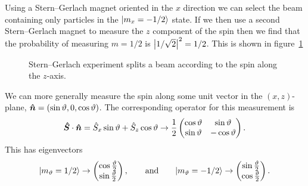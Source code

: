     Using a Stern--Gerlach magnet oriented in the \(x\) direction we can select the beam containing only particles in the \(\vert {m_x = -1/2} \rangle\) state.
    If we then use a second Stern--Gerlach magnet to measure the \(z\) component of the spin then we find that the probability of measuring \(m = 1/2\) is \(\abs{1/\sqrt{2}}^2 = 1/2\).
    This is shown in figure~\ref{fig:stern-gerlach x then z}
    \begin{figure}[ht]
        \centering
        \caption{Stern--Gerlach experiment splits a beam according to the spin along the \(z\)-axis.}
        \label{fig:stern-gerlach x then z}
    \end{figure}
    We can more generally measure the spin along some unit vector in the \((x, z)\)-plane, \(\bm{\hat{n}} = (\sin\vartheta, 0, \cos\vartheta)\).
    The corresponding operator for this measurement is
    \[
        \bm{\hat{S}}\cdot\bm{\hat{n}} = \hat{S}_x\sin\vartheta + \hat{S}_z\cos\vartheta \mathrel{\rightarrow} \frac{1}{2}
        \begin{pmatrix}
            \cos\vartheta & \sin\vartheta\\
            \sin\vartheta & -\cos\vartheta
        \end{pmatrix}
        .
    \]
    This has eigenvectors
    \[
        \vert {m_{\vartheta} = 1/2} \rangle \mathrel{\rightarrow}
        \begin{pmatrix}
            \cos \frac{\vartheta}{2}\\
            \sin \frac{\vartheta}{2}
        \end{pmatrix}
        , \qquad\text{and}\qquad
        \vert {m_{\vartheta} = -1/2} \rangle \mathrel{\rightarrow}
        \begin{pmatrix}
            \sin \frac{\vartheta}{2}\\
            \cos \frac{\vartheta}{2}
        \end{pmatrix}
        .
    \]
    
